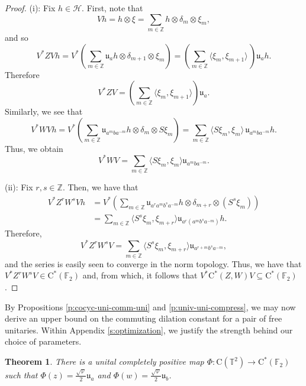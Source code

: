 \documentclass[10pt]{amsart}
\newcommand{\bF}{{\mathbb{F}}}
\newcommand{\bT}{{\mathbb{T}}}
\newcommand{\bZ}{{\mathbb{Z}}}
\renewcommand{\H}{{\mathcal{H}}}
\newcommand{\rC}{\mathrm{C}}
\renewcommand{\phi}{\varphi}
\newtheorem{theorem}{Theorem}[section]
\begin{document}
\begin{proof}
    (i): Fix $h\in\H$. First, note that
    \[
        V h = h\otimes\xi = \sum_{m\in\bZ} h\otimes\delta_m\otimes\xi_m,
    \]
    and so
    \[
        V^*ZVh = V^*\left(\sum_{m\in\bZ}\mathfrak{u}_ah\otimes\delta_{m+1}\otimes\xi_m\right) = \left(\sum_{m\in\bZ} \langle \xi_m,\xi_{m+1}\rangle\,\right) \mathfrak{u}_ah.
    \]
    Therefore
    \[
        V^*ZV = \left( \sum_{m\in\bZ} \langle \xi_m,\xi_{m+1}\rangle \right)\mathfrak{u}_a.
    \]
    Similarly, we see that
    \[
        V^*WV h = V^*\left(\sum_{m\in\bZ} \mathfrak{u}_{a^m b a^{-m}}h\otimes\delta_m\otimes S\xi_m\right) = \sum_{m\in\bZ} \langle S\xi_m,\xi_m\rangle\, \mathfrak{u}_{a^m b a^{-m}}h.
    \]
    Thus, we obtain
    \[
        V^*WV = \sum_{m\in\bZ} \langle S\xi_m,\xi_m\rangle \mathfrak{u}_{a^m b a^{-m}}.
    \]

    (ii): Fix $r,s\in\bZ$. Then, we have that
    \begin{align*}
        V^* Z^r W^s Vh & = V^*\left( \sum_{m\in\bZ} \mathfrak{u}_{a^r a^mb^sa^{-m}}h \otimes \delta_{m+r}\otimes(S^s\xi_m)\right)\\
        & = \sum_{m\in\bZ} \langle S^s \xi_m, \xi_{m+r}\rangle \mathfrak{u}_{a^r(a^mb^sa^{-m})}h.
    \end{align*}
    Therefore,
    \[
        V^* Z^rW^s V = \sum_{m\in\bZ} \langle S^s\xi_m, \xi_{m+r}\rangle \mathfrak{u}_{a^{r+m}b^sa^{-m}},
    \]
    and the series is easily seen to converge in the norm topology. Thus, we have that $V^* Z^rW^s V\in\rC^*(\bF_2)$ and, from which, it follows that $V^*\rC^*(Z,W)V\subseteq\rC^*(\bF_2)$.
\end{proof}

By Propositions \ref{p:cocyc-uni-comm-uni} and \ref{p:univ-uni-compress}, we may now derive an upper bound on the commuting dilation constant for a pair of free unitaries. Within Appendix \ref{s:optimization}, we justify the strength behind our choice of parameters.

\begin{theorem}\label{t:uni-comm-dil-constant}
    There is a unital completely positive map $\Phi:\rC(\bT^2)\rightarrow\rC^*(\bF_2)$ such that $\Phi(z) = \frac{\sqrt{\phi}}{2}\mathfrak{u}_a$ and $\Phi(w) = \frac{\sqrt{\phi}}{2}\mathfrak{u}_b$.
\end{theorem}
\end{document}
